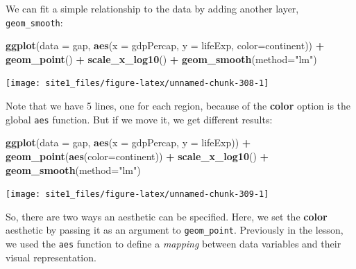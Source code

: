 \documentclass[]{book}
\newenvironment{Shaded}{\begin{snugshade}}{\end{snugshade}}
\newcommand{\DataTypeTok}[1]{\textcolor[rgb]{0.13,0.29,0.53}{#1}}
\newcommand{\KeywordTok}[1]{\textcolor[rgb]{0.13,0.29,0.53}{\textbf{#1}}}
\newcommand{\NormalTok}[1]{#1}
\newcommand{\OperatorTok}[1]{\textcolor[rgb]{0.81,0.36,0.00}{\textbf{#1}}}
\newcommand{\StringTok}[1]{\textcolor[rgb]{0.31,0.60,0.02}{#1}}
\begin{document}
We can fit a simple relationship to the data by adding another layer, \texttt{geom\_smooth}:

\begin{Shaded}
\begin{Highlighting}[]
\KeywordTok{ggplot}\NormalTok{(}\DataTypeTok{data =}\NormalTok{ gap, }\KeywordTok{aes}\NormalTok{(}\DataTypeTok{x =}\NormalTok{ gdpPercap, }\DataTypeTok{y =}\NormalTok{ lifeExp, }\DataTypeTok{color=}\NormalTok{continent)) }\OperatorTok{+}\StringTok{ }
\StringTok{  }\KeywordTok{geom_point}\NormalTok{() }\OperatorTok{+}\StringTok{ }
\StringTok{  }\KeywordTok{scale_x_log10}\NormalTok{() }\OperatorTok{+}\StringTok{ }
\StringTok{  }\KeywordTok{geom_smooth}\NormalTok{(}\DataTypeTok{method=}\StringTok{"lm"}\NormalTok{)}
\end{Highlighting}
\end{Shaded}

\begin{center}\texttt{[image: site1\_files/figure-latex/unnamed-chunk-308-1]} \end{center}

Note that we have 5 lines, one for each region, because of the \textbf{color} option is the global \texttt{aes} function. But if we move it, we get different results:

\begin{Shaded}
\begin{Highlighting}[]
\KeywordTok{ggplot}\NormalTok{(}\DataTypeTok{data =}\NormalTok{ gap, }\KeywordTok{aes}\NormalTok{(}\DataTypeTok{x =}\NormalTok{ gdpPercap, }\DataTypeTok{y =}\NormalTok{ lifeExp)) }\OperatorTok{+}\StringTok{ }
\StringTok{  }\KeywordTok{geom_point}\NormalTok{(}\KeywordTok{aes}\NormalTok{(}\DataTypeTok{color=}\NormalTok{continent)) }\OperatorTok{+}\StringTok{ }
\StringTok{  }\KeywordTok{scale_x_log10}\NormalTok{() }\OperatorTok{+}\StringTok{ }
\StringTok{  }\KeywordTok{geom_smooth}\NormalTok{(}\DataTypeTok{method=}\StringTok{"lm"}\NormalTok{)}
\end{Highlighting}
\end{Shaded}

\begin{center}\texttt{[image: site1\_files/figure-latex/unnamed-chunk-309-1]} \end{center}

So, there are two ways an aesthetic can be specified. Here, we set the \textbf{color} aesthetic by passing it as an argument to \texttt{geom\_point}. Previously in the lesson, we used the \texttt{aes} function to define a \emph{mapping} between data variables and their visual representation.
\end{document}
